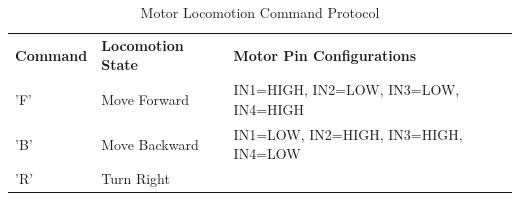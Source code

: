 \documentclass[12pt,a4paper,oneside]{report}
\begin{document}
\begin{longtable}[]{@{}
  >{\raggedright\arraybackslash}p{}
  >{\raggedright\arraybackslash}p{}
  >{\raggedright\arraybackslash}p{}@{}}
\caption{Motor Locomotion Command Protocol\label{tab:table10}}\\

\toprule\noalign{}
\begin{minipage}[b]{\linewidth}\centering
\textbf{Command}
\end{minipage} & \begin{minipage}[b]{\linewidth}\centering
\textbf{Locomotion State}
\end{minipage} & \begin{minipage}[b]{\linewidth}\raggedright

\textbf{Motor Pin Configurations}

\end{minipage} \\
\begin{minipage}[b]{\linewidth}\centering
'F'
\end{minipage} & \begin{minipage}[b]{\linewidth}\centering
Move Forward
\end{minipage} & \begin{minipage}[b]{\linewidth}\raggedright

IN1=HIGH, IN2=LOW, IN3=LOW, IN4=HIGH

\end{minipage} \\
\begin{minipage}[b]{\linewidth}\centering
'B'
\end{minipage} & \begin{minipage}[b]{\linewidth}\centering
Move Backward
\end{minipage} & \begin{minipage}[b]{\linewidth}\raggedright

IN1=LOW, IN2=HIGH, IN3=HIGH, IN4=LOW

\end{minipage} \\
\begin{minipage}[b]{\linewidth}\centering
'R'
\end{minipage} & \begin{minipage}[b]{\linewidth}\centering
Turn Right
\end{minipage} & \begin{minipage}[b]{\linewidth}\raggedright


\end{minipage}
\end{longtable}
\end{document}
